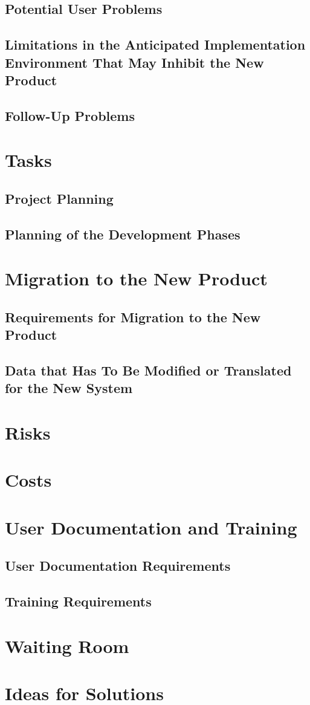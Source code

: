 \documentclass[paper=letter, fontsize=10pt]{scrartcl}
\numberwithin{equation}{section}		%
\numberwithin{figure}{section}			%
\numberwithin{table}{section}				%
\begin{document}
\subsection{Potential User Problems}
\subsection{Limitations in the Anticipated Implementation Environment That May Inhibit the New Product}
\subsection{Follow-Up Problems}

\section{Tasks}
\subsection{Project Planning}
\subsection{Planning of the Development Phases}

\section{Migration to the New Product}
\subsection{Requirements for Migration to the New Product}
\subsection{Data that Has To Be Modified or Translated for the New System}

\section{Risks}

\section{Costs}

\section{User Documentation and Training}
\subsection{User Documentation Requirements}
\subsection{Training Requirements}

\section{Waiting Room}

\section{Ideas for Solutions}

\end{document}
